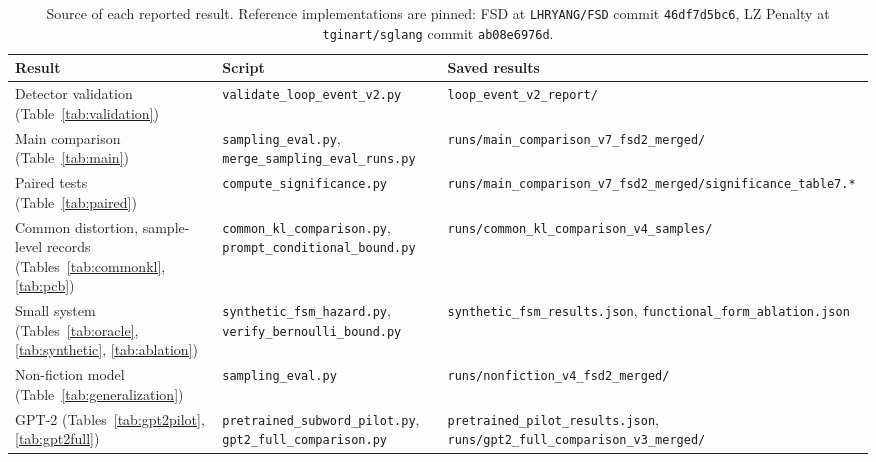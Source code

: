 \documentclass[11pt]{article}
\begin{document}
\begin{table}[H]
\centering
\caption{Source of each reported result. Reference implementations are pinned: FSD at \texttt{LHRYANG/FSD} commit \texttt{46df7d5bc6}, LZ Penalty at \texttt{tginart/sglang} commit \texttt{ab08e6976d}.}
\label{tab:manifest}
\footnotesize
\begin{tabular}{@{}p{3.6cm}p{4.6cm}p{6.8cm}@{}}
\toprule
Result & Script & Saved results \\
\midrule
Detector validation (Table~\ref{tab:validation}) & \texttt{validate\_\allowbreak{}loop\_\allowbreak{}event\_\allowbreak{}v2.py} & \texttt{loop\_\allowbreak{}event\_\allowbreak{}v2\_\allowbreak{}report/} \\
Main comparison (Table~\ref{tab:main}) & \texttt{sampling\_\allowbreak{}eval.py}, \texttt{merge\_\allowbreak{}sampling\_\allowbreak{}eval\_\allowbreak{}runs.py} & \texttt{runs/main\_\allowbreak{}comparison\_\allowbreak{}v7\_\allowbreak{}fsd2\_\allowbreak{}merged/} \\
Paired tests (Table~\ref{tab:paired}) & \texttt{compute\_\allowbreak{}significance.py} & \texttt{runs/main\_\allowbreak{}comparison\_\allowbreak{}v7\_\allowbreak{}fsd2\_\allowbreak{}merged/significance\_\allowbreak{}table7.*} \\
Common distortion, sample-level records (Tables~\ref{tab:commonkl}, \ref{tab:pcb}) & \texttt{common\_\allowbreak{}kl\_\allowbreak{}comparison.py}, \texttt{prompt\_\allowbreak{}conditional\_\allowbreak{}bound.py} & \texttt{runs/common\_\allowbreak{}kl\_\allowbreak{}comparison\_\allowbreak{}v4\_\allowbreak{}samples/} \\
Small system (Tables~\ref{tab:oracle}, \ref{tab:synthetic}, \ref{tab:ablation}) & \texttt{synthetic\_\allowbreak{}fsm\_\allowbreak{}hazard.py}, \texttt{verify\_\allowbreak{}bernoulli\_\allowbreak{}bound.py} & \texttt{synthetic\_\allowbreak{}fsm\_\allowbreak{}results.json}, \texttt{functional\_\allowbreak{}form\_\allowbreak{}ablation.json} \\
Non-fiction model (Table~\ref{tab:generalization}) & \texttt{sampling\_\allowbreak{}eval.py} & \texttt{runs/nonfiction\_\allowbreak{}v4\_\allowbreak{}fsd2\_\allowbreak{}merged/} \\
GPT-2 (Tables~\ref{tab:gpt2pilot}, \ref{tab:gpt2full}) & \texttt{pretrained\_\allowbreak{}subword\_\allowbreak{}pilot.py}, \texttt{gpt2\_\allowbreak{}full\_\allowbreak{}comparison.py} & \texttt{pretrained\_\allowbreak{}pilot\_\allowbreak{}results.json}, \texttt{runs/gpt2\_\allowbreak{}full\_\allowbreak{}comparison\_\allowbreak{}v3\_\allowbreak{}merged/} \\

\end{tabular}
\end{table}
\end{document}
